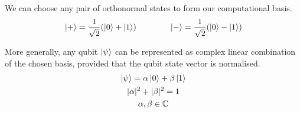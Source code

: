 We can choose any pair of orthonormal states to form our computational basis.
\begin{equation*}
\begin{gathered}
    \ket + = \frac{1}{\sqrt{2}} (\ket 0 + \ket 1) \qquad\qquad
    \ket - = \frac{1}{\sqrt{2}} (\ket 0 - \ket 1)
\end{gathered}
\end{equation*}

More generally, any qubit $\ket\psi$ can be represented as complex linear combination of the chosen basis, provided that the qubit state vector is normalised.
\begin{equation*}
\begin{gathered}
    \ket \psi = \alpha\ket 0 + \beta\ket 1 \\
    |\alpha|^2 + |\beta|^2 = 1 \\
    \alpha, \beta \in \mathbb{C}
\end{gathered}
\end{equation*}

